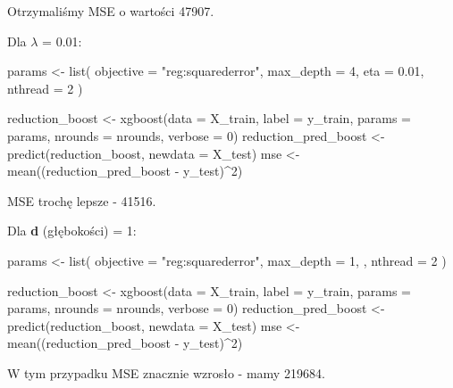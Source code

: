 Otrzymaliśmy MSE o wartości 47907.

Dla $\lambda$ = 0.01:
\begin{Rcode}
params <- list(
  objective = "reg:squarederror",  
  max_depth = 4,                   
  eta = 0.01,                     
  nthread = 2                     
)

reduction_boost <- xgboost(data = X_train, label = y_train, params = params, nrounds = nrounds, verbose = 0)
reduction_pred_boost <- predict(reduction_boost, newdata = X_test)
mse <- mean((reduction_pred_boost - y_test)^2)
\end{Rcode}

MSE trochę lepsze - 41516.

Dla \textbf{d} (głębokości) = 1:
\begin{Rcode}
params <- list(
  objective = "reg:squarederror",  
  max_depth = 1,                   ,                    
  nthread = 2                     
)

reduction_boost <- xgboost(data = X_train, label = y_train, params = params, nrounds = nrounds, verbose = 0)
reduction_pred_boost <- predict(reduction_boost, newdata = X_test)
mse <- mean((reduction_pred_boost - y_test)^2)
\end{Rcode}

W tym przypadku MSE znacznie wzrosło - mamy 219684.
